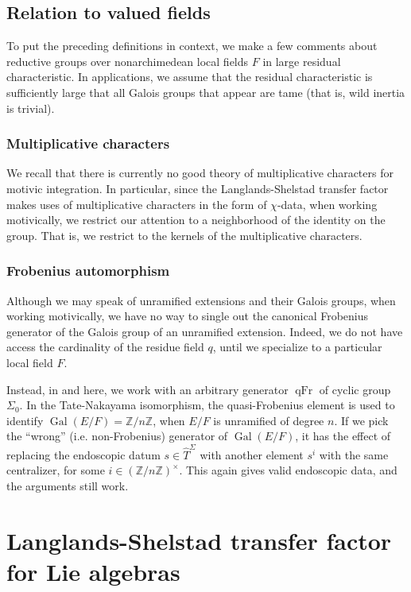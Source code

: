 \documentclass[12pt]{amsart}
\newcommand{\op}[1]{\operatorname{#1}}
\newcommand{\ring}[1]{{\mathbb #1}}
\theoremstyle{plain}
\theoremstyle{definition}
\begin{document}
\subsection{Relation to valued fields}

To put the preceding definitions in context, we make a few comments
about reductive groups over nonarchimedean local fields $F$ in large
residual characteristic.  In applications, we assume that the residual
characteristic is sufficiently large that all Galois groups that
appear are tame (that is, wild inertia is trivial).


\subsubsection{Multiplicative characters}

We recall that there is currently no good theory of multiplicative
characters for motivic integration.  In particular, since the
Langlands-Shelstad transfer factor makes uses of multiplicative
characters in the form of $\chi$-data, when working motivically,
we restrict our attention to a neighborhood of the identity on the
group.  That is, we restrict to the kernels of the multiplicative
characters.

\subsubsection{Frobenius automorphism}

Although we may speak of unramified extensions and their Galois
groups, when working motivically, we have no way to single out the
canonical Frobenius generator of the Galois group of an unramified
extension.  Indeed, we do not have access the cardinality of the
residue field $q$, until we specialize to a particular local field
$F$.

Instead, in \cite{CHL} and here, we work with an arbitrary generator
$\op{qFr}$ of cyclic group $\Sigma_0$.  In the Tate-Nakayama
isomorphism, the quasi-Frobenius element is used to identify
$\op{Gal}(E/F) = \ring{Z}/n\ring{Z}$, when $E/F$ is unramified of
degree $n$.  If we pick the ``wrong'' (i.e. non-Frobenius) generator
of $\op{Gal}(E/F)$, it has the effect of replacing the endoscopic
datum $s\in \hat T^\Sigma$ with another element $s^i$ with the same
centralizer, for some $i\in (\ring{Z}/n\ring{Z})^\times$.  This again
gives valid endoscopic data, and the arguments still work.


\section{Langlands-Shelstad transfer factor for Lie algebras}\label{sec:lsxfer}
\end{document}
